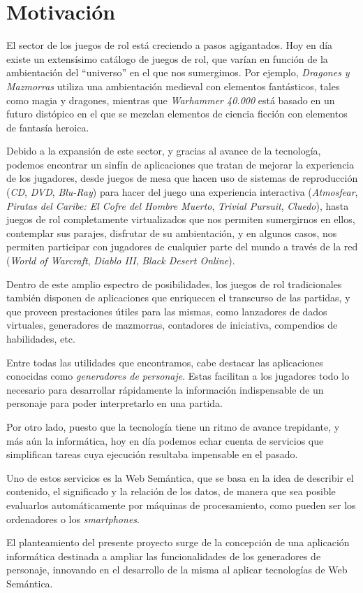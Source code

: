 
\section{Motivación}
El sector de los juegos de rol está creciendo a pasos 
agigantados. Hoy en día existe un extensísimo 
catálogo de juegos de rol, que varían en función de la 
ambientación del ``universo'' en el que nos sumergimos. Por 
ejemplo, \textit{Dragones y Mazmorras} utiliza una 
ambientación medieval con elementos fantásticos, tales como 
magia y dragones, mientras que \textit{Warhammer 40.000} 
está basado en un futuro distópico en el que se mezclan 
elementos de ciencia ficción con elementos de fantasía 
heroica. \medskip

Debido a la expansión de este sector, y gracias al avance 
de la tecnología, podemos encontrar un sinfín de aplicaciones 
que tratan de mejorar la experiencia de los jugadores, 
desde juegos de mesa que hacen uso de sistemas de 
reproducción (\textit{CD}, \textit{DVD}, 
\textit{Blu-Ray}) para hacer del juego una experiencia 
interactiva (\textit{Atmosfear}, \textit{Piratas
del Caribe: El Cofre del Hombre Muerto}, \textit{Trivial 
Pursuit}, \textit{Cluedo}), hasta juegos de rol completamente
virtualizados que nos permiten sumergirnos en ellos, contemplar
sus parajes, disfrutar de su ambientación, y en algunos casos, 
nos permiten participar con jugadores de cualquier parte del 
mundo a través de la red (\textit{World of Warcraft}, \textit{Diablo III}, 
\textit{Black Desert Online}). \medskip

Dentro de este amplio espectro de posibilidades, los juegos de rol 
tradicionales también disponen de aplicaciones que enriquecen el 
transcurso de las partidas, y que proveen prestaciones útiles para las 
mismas, como lanzadores de dados virtuales, generadores de mazmorras, 
contadores de iniciativa, compendios de habilidades, etc. \medskip

Entre todas las utilidades que encontramos, cabe destacar las aplicaciones 
conocidas como \textit{generadores de personaje}. Estas facilitan a los 
jugadores todo lo necesario para desarrollar rápidamente la información 
indispensable de un personaje para poder interpretarlo en una partida. \medskip

Por otro lado, puesto que la tecnología tiene un ritmo de avance trepidante, 
y más aún la informática, hoy en día podemos echar cuenta de servicios 
que simplifican tareas cuya ejecución resultaba impensable en el pasado.
\medskip

Uno de estos servicios es la Web Semántica, que se basa en la idea de 
describir el contenido, el significado y la relación 
de los datos, de manera que sea posible evaluarlos automáticamente por 
máquinas de procesamiento, como pueden ser los ordenadores o los 
\textit{smartphones}.
\medskip

El planteamiento del presente proyecto surge de la concepción de una 
aplicación informática destinada a ampliar las funcionalidades de 
los generadores de personaje, innovando en el desarrollo de la misma 
al aplicar tecnologías de Web Semántica.\medskip
